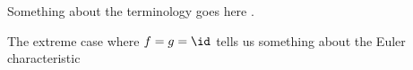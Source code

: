\begin{war}
    Something about the terminology goes here .
\end{war}

\begin{exam}
    The extreme case where $f=g=\id$ tells us something
    about the Euler characteristic 
\end{exam}




   
